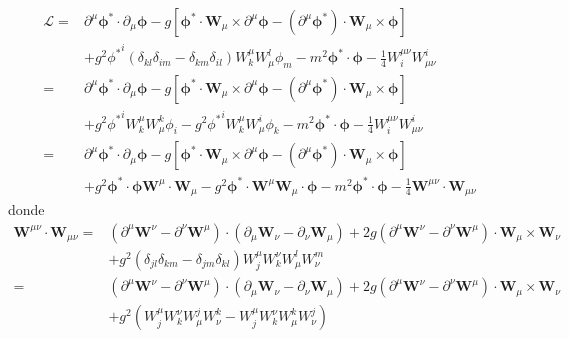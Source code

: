 \begin{itemize}
   \begin{align}
\mathcal{L}=&
      \partial^\mu{\boldsymbol{\phi}^*}\cdot\partial_\mu\boldsymbol{\phi}-g\left[{\boldsymbol{\phi}^*}\cdot\mathbf{W}_\mu\times\partial^\mu\boldsymbol{\phi}
    -\left(\partial^\mu{\boldsymbol{\phi}^*}\right)\cdot\mathbf{W}_\mu\times\boldsymbol{\phi}\right]
  \nonumber\\
  &+g^2{\phi^*}^i (\delta_{kl}\delta_{im}-\delta_{km}\delta_{il})W^\mu_k W_\mu^l\phi_m-m^2{\boldsymbol{\phi}^*}\cdot \boldsymbol{\phi}-\tfrac{1}{4}W^{\mu\nu}_iW_{\mu\nu}^i\nonumber\\
  =&\partial^\mu{\boldsymbol{\phi}^*}\cdot\partial_\mu\boldsymbol{\phi}-g\left[{\boldsymbol{\phi}^*}\cdot\mathbf{W}_\mu\times\partial^\mu\boldsymbol{\phi}
    -\left(\partial^\mu{\boldsymbol{\phi}^*}\right)\cdot\mathbf{W}_\mu\times\boldsymbol{\phi}\right]
  \nonumber\\
  &+g^2{\phi^*}^i W^\mu_k W_\mu^k\phi_i-g^2{\phi^*}^i W^\mu_k W_\mu^i\phi_k-m^2{\boldsymbol{\phi}^*}\cdot \boldsymbol{\phi}-\tfrac{1}{4}W^{\mu\nu}_iW_{\mu\nu}^i\nonumber\\
  =&\partial^\mu{\boldsymbol{\phi}^*}\cdot\partial_\mu\boldsymbol{\phi}-g\left[{\boldsymbol{\phi}^*}\cdot\mathbf{W}_\mu\times\partial^\mu\boldsymbol{\phi}
    -\left(\partial^\mu{\boldsymbol{\phi}^*}\right)\cdot\mathbf{W}_\mu\times\boldsymbol{\phi}\right]
  \nonumber\\
  &+g^2\boldsymbol{\phi^*}\cdot\boldsymbol{\phi}\mathbf{W}^\mu\cdot \mathbf{W}_\mu-g^2\mathbf{\phi^*}\cdot\mathbf{W}^\mu \mathbf{W}_\mu\cdot\boldsymbol{\phi}-m^2{\boldsymbol{\phi}^*}\cdot  \boldsymbol{\phi}-\tfrac{1}{4}\mathbf{W}^{\mu\nu}\cdot\mathbf{W}_{\mu\nu}
   \end{align}
donde
\begin{align}
     \mathbf{W}^{\mu\nu}\cdot\mathbf{W}_{\mu\nu}=&(\partial^\mu \mathbf{W}^\nu -\partial^\nu \mathbf{W}^\mu)\cdot(\partial_\mu \mathbf{W}_\nu -\partial_\nu \mathbf{W}_\mu)
    +2g(\partial^\mu \mathbf{W}^\nu -\partial^\nu \mathbf{W}^\mu)\cdot \mathbf{W}_\mu\times\mathbf{W}_\nu\nonumber\\
    &+g^2(\delta_{jl}\delta_{km}-\delta_{jm}\delta_{kl})W^\mu_j W^\nu_k W_\mu^l W_\nu^m\nonumber\\
    =&(\partial^\mu \mathbf{W}^\nu -\partial^\nu \mathbf{W}^\mu)\cdot(\partial_\mu \mathbf{W}_\nu -\partial_\nu \mathbf{W}_\mu)
    +2g(\partial^\mu \mathbf{W}^\nu -\partial^\nu \mathbf{W}^\mu)\cdot \mathbf{W}_\mu\times\mathbf{W}_\nu\nonumber\\
    &+g^2(W^\mu_j W^\nu_kW_\mu^j W_\nu^k-W^\mu_j W^\nu_k W_\mu^k W_\nu^j)\nonumber\\

\end{align}
\end{itemize}
